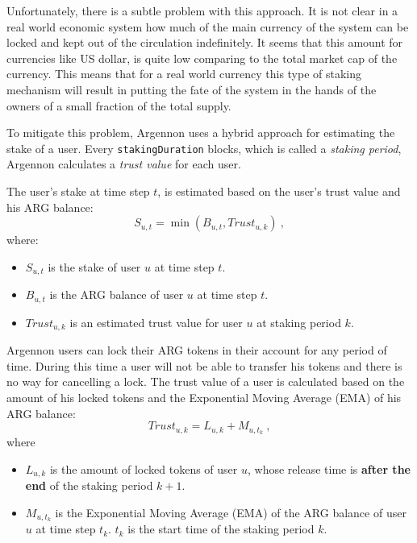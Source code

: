 Unfortunately, there is a subtle problem with this approach. It is not clear in a real world economic system
how much of the main currency of the system can be locked and kept out of the circulation indefinitely. It seems that
this amount for currencies like US dollar, is quite low comparing to the total market cap of the currency.
This means that for a real world currency this type of staking mechanism will result in putting the
fate of the system in the hands of the owners of a small fraction of the total supply.

To mitigate this problem, Argennon uses a hybrid approach for estimating the stake of a user.
Every \texttt{stakingDuration} blocks, which is called a \emph{staking period}, Argennon calculates
a \emph{trust value} for each user.

The user's stake
at time step \(t\), is estimated based on the user's trust value and his ARG balance:
\begin{equation}
    S_{u,t} = \min (B_{u,t}, Trust_{u,k})\ ,\label{eq:stake}
\end{equation}
where:
\begin{itemize}
    \item \(S_{u,t}\) is the stake of user \(u\) at time step \(t\).
    \item \(B_{u,t}\) is the ARG balance of user \(u\) at time step \(t\).
    \item \(Trust_{u,k}\) is an estimated trust value for user \(u\) at staking period \(k\).
\end{itemize}

Argennon users can lock their ARG tokens in their account for any period of time. During this time a user
will not be able to transfer his tokens and there is no way for cancelling a lock.
The trust value of a user is calculated based on the amount of his locked tokens and the
Exponential Moving Average (EMA) of his ARG balance:
\begin{equation}
    Trust_{u,k} = L_{u,k} + M_{u,t_k}\ ,\label{eq:trust}
\end{equation}
where
\begin{itemize}
    \item $L_{u,k}$ is the amount of locked tokens of user $u$, whose release time is \textbf{after the end} of
    the staking period $k+1$.
    \item $M_{u,t_k}$ is the Exponential Moving Average (EMA) of the ARG balance of user \(u\) at time step \(t_k\).
    $t_k$ is the start time of the staking period $k$.
\end{itemize}

